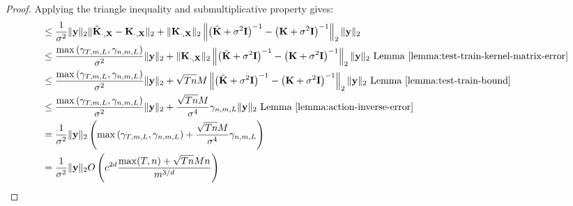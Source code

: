 \begin{proof}
Applying the triangle inequality and submultiplicative property gives:
\begin{align*}
    &\leq \frac{1}{\sigma^2}\Vert \textbf{y}\Vert_2\Vert \tilde{\mathbf{K}}_{\cdot, \mathbf{X}} -\mathbf{K}_{\cdot,\mathbf{X}}\Vert_2+\Vert\mathbf{K}_{\cdot,\mathbf{X}}\Vert_2\left\Vert \left( \tilde{\mathbf{K}} + \sigma^{2} \mathbf{I} \right)^{-1} - \left(\mathbf{K} + \sigma^{2} \mathbf{I} \right)^{-1}\right\Vert_2\Vert \textbf{y}\Vert_2\\
    &\leq \frac{\max\left(\gamma_{T,m,L},\gamma_{n,m,L}\right)}{\sigma^2}\Vert \textbf{y}\Vert_2+\Vert\mathbf{K}_{\cdot,\mathbf{X}}\Vert_2\left\Vert \left( \tilde{\mathbf{K}} + \sigma^{2} \mathbf{I} \right)^{-1} - \left(\mathbf{K} + \sigma^{2} \mathbf{I} \right)^{-1}\right\Vert_2\Vert \textbf{y}\Vert_2\text{ Lemma \ref{lemma:test-train-kernel-matrix-error}}\\
    &\leq \frac{\max\left(\gamma_{T,m,L},\gamma_{n,m,L}\right)}{\sigma^2}\Vert \textbf{y}\Vert_2+\sqrt{Tn}M\left\Vert \left( \tilde{\mathbf{K}} + \sigma^{2} \mathbf{I} \right)^{-1} - \left(\mathbf{K} + \sigma^{2} \mathbf{I} \right)^{-1}\right\Vert_2\Vert \textbf{y}\Vert_2\text{ Lemma \ref{lemma:test-train-bound}}\\
    &\leq \frac{\max\left(\gamma_{T,m,L},\gamma_{n,m,L}\right)}{\sigma^2}\Vert \textbf{y}\Vert_2+\frac{\sqrt{Tn}M}{\sigma^4}\gamma_{n,m,L}\Vert \textbf{y}\Vert_2 \text{ Lemma \ref{lemma:action-inverse-error}}\\
    &=\frac{1}{\sigma^2}\Vert \textbf{y}\Vert_2\left(\max\left(\gamma_{T,m,L},\gamma_{n,m,L}\right)+\frac{\sqrt{Tn}M}{\sigma^4}\gamma_{n,m,L}\right)\\
    &=\frac{1}{\sigma^2}\Vert \textbf{y}\Vert_2O\left(c^{2d}\frac{\max(T,n)+\sqrt{Tn}Mn}{m^{3/d}}\right)
\end{align*}


\end{proof}
